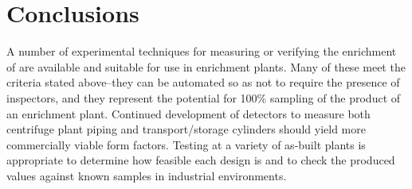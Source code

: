 \documentclass{IEEEtran}
\begin{document}
\section{Conclusions}
A number of experimental techniques for measuring or verifying the enrichment of  are available and suitable for use in enrichment plants. Many of these meet the criteria stated above--they can be automated so as not to require the presence of inspectors, and they represent the potential for 100\% sampling of the product of an enrichment plant. Continued development of detectors to measure both centrifuge plant piping and transport/storage cylinders should yield more commercially viable form factors. Testing at a variety of as-built plants is appropriate to determine how feasible each design is and to check the produced values against known samples in industrial environments.

\printbibliography
\end{document}
